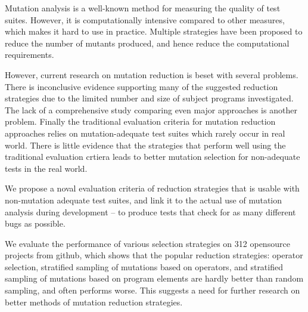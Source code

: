 Mutation analysis is a well-known method for measuring the quality of
test suites. However, it is computationally intensive compared to other
measures, which makes it hard to use in practice. Multiple strategies have
been proposed to reduce the number of mutants produced, and hence reduce
the computational requirements.

%
However, current research on mutation reduction is beset with several
problems. There is inconclusive evidence supporting many of the suggested
reduction strategies due to the limited number and size of subject programs
investigated. The lack of a comprehensive study comparing even major approaches
is another problem. Finally the traditional evaluation criteria for mutation
reduction approaches relies on mutation-adequate test suites which rarely occur
in real world. There is little evidence that the strategies that perform well
using the traditional evaluation crtiera leads to better mutation selection
for non-adequate tests in the real world.


We propose a noval evaluation criteria of reduction strategies that is
usable with non-mutation adequate test suites, and link it to the actual
use of mutation analysis during development -- to produce tests that check
for as many different bugs as possible.

We evaluate the performance of various selection strategies on 312 opensource
projects from github, which shows that the popular reduction strategies:
operator selection, stratified sampling of mutations based on operators,
and stratified sampling of mutations based on program elements are hardly
better than random sampling, and often performs worse.  This suggests a need
for further research on better methods of mutation reduction strategies.


